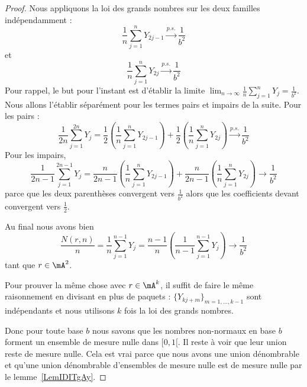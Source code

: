 \begin{proof}
	Nous appliquons la loi des grands nombres sur les deux familles indépendamment :
	\begin{equation}
		\frac{1}{ n }\sum_{j=1}^nY_{2j-1}\stackrel{p.s.}{\longrightarrow}\frac{1}{ b^2 }
	\end{equation}
	et
	\begin{equation}
		\frac{1}{ n }\sum_{j=1}^nY_{2j}\stackrel{p.s.}{\longrightarrow}\frac{1}{ b^2 }
	\end{equation}
	Pour rappel, le but pour l'instant est d'établir la limite \( \lim_{n\to \infty} \frac{1}{ n }\sum_{j=1}^nY_j=\frac{1}{ b^2 }\). Nous allons l'établir séparément pour les termes pairs et impairs de la suite. Pour les pairs :
	\begin{equation}
		\frac{1}{ 2n }\sum_{j=1}^{2n}Y_j=\frac{ 1 }{2}\left( \frac{1}{ n }\sum_{j=1}^nY_{2j-1} \right)+\frac{ 1 }{2}\left( \frac{1}{ n }\sum_{j=1}^nY_{2j} \right)\stackrel{p.s.}{\longrightarrow}\frac{1}{ b^2 }
	\end{equation}
	Pour les impairs,
	\begin{equation}
		\frac{1}{ 2n-1 }\sum_{j=1}^{2n-1}Y_j=\frac{ n }{ 2n-1 }\left( \frac{1}{ n }\sum_{j=1}^nY_{2j-1} \right)+\frac{ n }{ 2n-1 }\left( \frac{1}{ n }\sum_{j=1}^nY_{2j} \right)\to\frac{1}{ b^2 }
	\end{equation}
	parce que les deux parenthèses convergent vers \( \frac{1}{ b^2 }\) alors que les coefficients devant convergent vers \( \frac{ 1 }{2}\).

	Au final nous avons bien
	\begin{equation}
		\frac{ N(r,n) }{ n }=\frac{1}{ n }\sum_{j=1}^{n-1}Y_j=\frac{ n-1 }{ n }\left( \frac{1}{ n-1 }\sum_{j=1}^{n-1}Y_j \right)\to\frac{1}{ b^2 }
	\end{equation}
	tant que \( r\in\mA^2\).

	Pour prouver la même chose avec \( r\in \mA^k\), il suffit de faire le même raisonnement en divisant en plus de paquets : \( \{ Y_{kj+m} \}_{m=1,\ldots, k-1}\) sont indépendants et nous utilisons \( k\) fois la loi des grands nombres.

	Donc pour toute base \( b\) nous savons que les nombres non-normaux en base \( b\) forment un ensemble de mesure nulle dans \( \mathopen[ 0 , 1 [\). Il reste à voir que leur union reste de mesure nulle. Cela est vrai parce que nous avons une union dénombrable et qu'une union dénombrable d'ensembles de mesure nulle est de mesure nulle par le lemme~\ref{LemIDITgAy}.
\end{proof}

